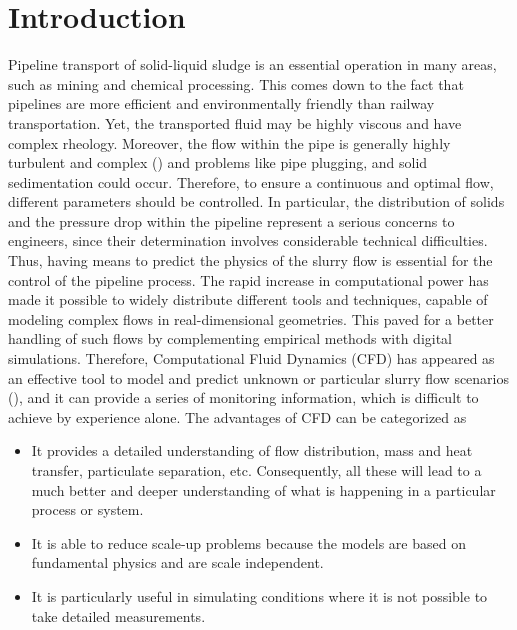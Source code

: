 \documentclass[11pt]{report}
\begin{document}
\maketitle
\tableofcontents
\chapter{Introduction}
\label{chap:intro}
Pipeline transport of solid-liquid sludge is an essential operation in many areas, such as mining and chemical processing.
%
This comes down to the fact that pipelines are more efficient and environmentally friendly than railway transportation.
%
Yet, the transported fluid may be highly viscous and have complex rheology.
%
Moreover, the flow within the pipe is  generally highly turbulent and complex (\citet{Lahiri-2010}) and problems like pipe plugging, and solid sedimentation could occur.
%
Therefore, to ensure a continuous and optimal flow, different parameters should be controlled.
%
In particular, the distribution of solids and the pressure drop within the pipeline represent a serious concerns to engineers, since their determination involves considerable technical difficulties.
%
Thus, having means to predict the physics of the slurry flow is essential for the control of the pipeline process.
%
The rapid increase in computational power has made it possible to widely distribute different tools and techniques, capable of modeling complex flows in real-dimensional geometries.
%
This paved for a better handling of such flows by complementing empirical methods with digital simulations.
%
Therefore, Computational Fluid Dynamics (CFD) has appeared as an effective tool to model and predict unknown or particular slurry flow scenarios (\citet{Bi-2002}), and it can provide a series of monitoring information, which is difficult to achieve by experience alone.
%
The advantages of CFD can be categorized as
%
\begin{itemize}
\item It provides a detailed understanding of flow distribution, mass and heat transfer, particulate separation, etc.
%
Consequently, all these will lead to a much better and deeper understanding of what is happening in a particular process or system.
%
\item It is able to reduce scale-up problems because the models are based on fundamental physics and are scale independent.
%
\item It is particularly useful in simulating conditions where it is not possible to take detailed measurements.
\end{itemize}
\end{document}
